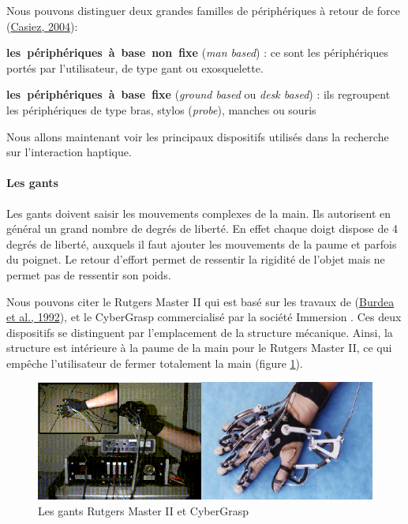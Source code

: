 \documentclass[
]{book}
\begin{document}
Nous pouvons distinguer deux grandes familles de périphériques à retour de
force (\protect\hyperlink{ref-casiez2004contribution}{Casiez, 2004}):

\textbf{les~périphériques~à~base~non~fixe}
(\emph{man based}) : ce sont les périphériques
portés par l'utilisateur, de type gant ou exosquelette.

\textbf{les~périphériques~à~base~fixe}
(\emph{ground
based} ou \emph{desk based}) : ils
regroupent les périphériques de type bras, stylos (\emph{probe}), manches
ou souris

Nous allons maintenant voir les principaux dispositifs utilisés dans la
recherche sur l'interaction haptique.

\hypertarget{les-gants}{%
\paragraph{Les gants}\label{les-gants}}

Les gants doivent saisir les mouvements complexes de la main. Ils
autorisent en général un grand nombre de degrés de liberté. En effet chaque
doigt dispose de 4 degrés de liberté, auxquels il faut ajouter les mouvements
de la paume et parfois du poignet. Le retour d'effort permet de ressentir la
rigidité de l'objet mais ne permet pas de ressentir son poids.

Nous pouvons citer le Rutgers Master II qui est basé sur les travaux de
(\protect\hyperlink{ref-burdea1992portable}{Burdea et al., 1992}), et le
CyberGrasp commercialisé par la société Immersion . Ces deux dispositifs se distinguent par
l'emplacement de la structure mécanique. Ainsi, la structure est intérieure à
la paume de la main pour le Rutgers Master II, ce qui empêche l'utilisateur
de fermer totalement la main (figure \ref{fig:rutgers}).

\begin{figure}
\centering
\includegraphics{img/rutgers.png}
\caption{\label{fig:rutgers}Les gants Rutgers Master II et CyberGrasp}
\end{figure}
\end{document}
